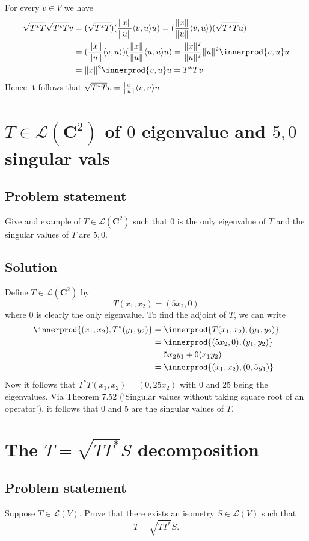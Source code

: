 \documentclass{article}
\DeclarePairedDelimiter{\innerprod}\langle\rangle
\begin{document}
For every $v\in V$ we have
\begin{align*}
    \sqrt{T^*T}\sqrt{T^*T}v &= (\sqrt{T^*T})(\frac{\norm{x}}{\norm{u}}\langle v,u\rangle u)= (\frac{\norm{x}}{\norm{u}}\langle v,u\rangle)(\sqrt{T^*T}u)\\
    &= (\frac{\norm{x}}{\norm{u}}\langle v,u\rangle)(\frac{\norm{x}}{\norm{u}}\langle u,u\rangle u)=\frac{\norm{x}^2}{\norm{u}^2}\norm{u}^2\innerprod{v,u}u\\
    &= \norm{x}^2\innerprod{v,u}u=T^*Tv
\end{align*}
Hence it follows that $\sqrt{T^*T}v=\frac{\lVert x\rVert}{\lVert u\rVert}\langle v,u\rangle u$.

\section{$T\in\mathcal{L}(\mathbf{C}^2)$ of $0$ eigenvalue and $5,0$ singular vals}
\subsection*{Problem statement}
Give and example of $T\in\mathcal{L}(\mathbf{C}^2)$ such that $0$ is the only eigenvalue of $T$ and the singular values of $T$ are $5,0$.

\subsection*{Solution}
Define $T\in\mathcal{L}(\mathbf{C}^2)$ by
\[T(x_1,x_2)=(5x_2,0)\]
where 0 is clearly the only eigenvalue. To find the adjoint of $T$, we can write
\begin{align*}
    \innerprod{(x_1,x_2),T^*(y_1,y_2)}&=\innerprod{T(x_1,x_2),(y_1,y_2)}\\
    &= \innerprod{(5x_2,0),(y_1,y_2)}\\
    &= 5x_2y_1+0(x_1y_2)\\
    &=\innerprod{(x_1,x_2),(0,5y_1)}
\end{align*}
Now it follows that $T^*T(x_1,x_2)=(0,25x_2)$ with $0$ and $25$ being the eigenvalues. Via Theorem 7.52 (`Singular values without taking square root of an operator'), it follows that $0$ and $5$ are the singular values of $T$.

\clearpage

\section{The $T=\sqrt{TT^*}S$ decomposition}
\subsection*{Problem statement}
Suppose $T\in\mathcal{L}(V)$. Prove that there exists an isometry $S\in\mathcal{L}(V)$ such that 
\[T=\sqrt{TT^*}S.\]
\end{document}
